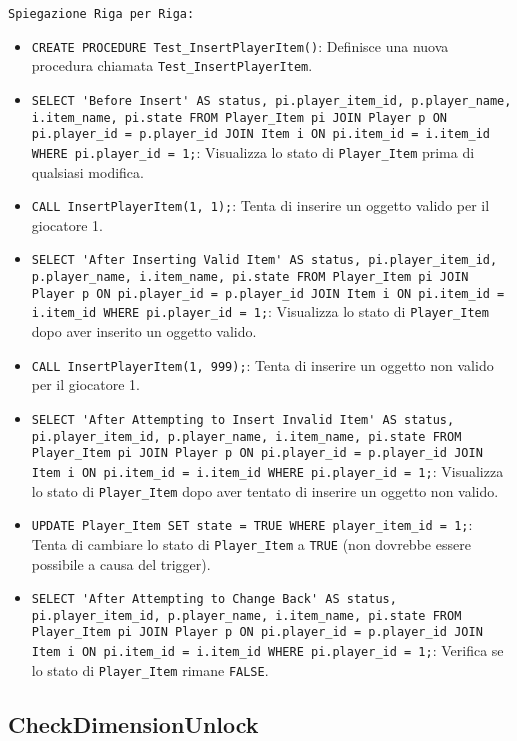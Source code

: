 \documentclass{article}
\begin{document}
\texttt{Spiegazione Riga per Riga:}
\begin{itemize}
    \item \lstinline|CREATE PROCEDURE Test_InsertPlayerItem()|: Definisce una nuova procedura chiamata \lstinline|Test_InsertPlayerItem|.
    \item \lstinline|SELECT 'Before Insert' AS status, pi.player_item_id, p.player_name, i.item_name, pi.state FROM Player_Item pi JOIN Player p ON pi.player_id = p.player_id JOIN Item i ON pi.item_id = i.item_id WHERE pi.player_id = 1;|: Visualizza lo stato di \lstinline|Player_Item| prima di qualsiasi modifica.
    \item \lstinline|CALL InsertPlayerItem(1, 1);|: Tenta di inserire un oggetto valido per il giocatore 1.
    \item \lstinline|SELECT 'After Inserting Valid Item' AS status, pi.player_item_id, p.player_name, i.item_name, pi.state FROM Player_Item pi JOIN Player p ON pi.player_id = p.player_id JOIN Item i ON pi.item_id = i.item_id WHERE pi.player_id = 1;|: Visualizza lo stato di \lstinline|Player_Item| dopo aver inserito un oggetto valido.
    \item \lstinline|CALL InsertPlayerItem(1, 999);|: Tenta di inserire un oggetto non valido per il giocatore 1.
    \item \lstinline|SELECT 'After Attempting to Insert Invalid Item' AS status, pi.player_item_id, p.player_name, i.item_name, pi.state FROM Player_Item pi JOIN Player p ON pi.player_id = p.player_id JOIN Item i ON pi.item_id = i.item_id WHERE pi.player_id = 1;|: Visualizza lo stato di \lstinline|Player_Item| dopo aver tentato di inserire un oggetto non valido.
    \item \lstinline|UPDATE Player_Item SET state = TRUE WHERE player_item_id = 1;|: Tenta di cambiare lo stato di \lstinline|Player_Item| a \lstinline|TRUE| (non dovrebbe essere possibile a causa del trigger).
    \item \lstinline|SELECT 'After Attempting to Change Back' AS status, pi.player_item_id, p.player_name, i.item_name, pi.state FROM Player_Item pi JOIN Player p ON pi.player_id = p.player_id JOIN Item i ON pi.item_id = i.item_id WHERE pi.player_id = 1;|: Verifica se lo stato di \lstinline|Player_Item| rimane \lstinline|FALSE|.
\end{itemize}

\subsection*{CheckDimensionUnlock}
\end{document}
